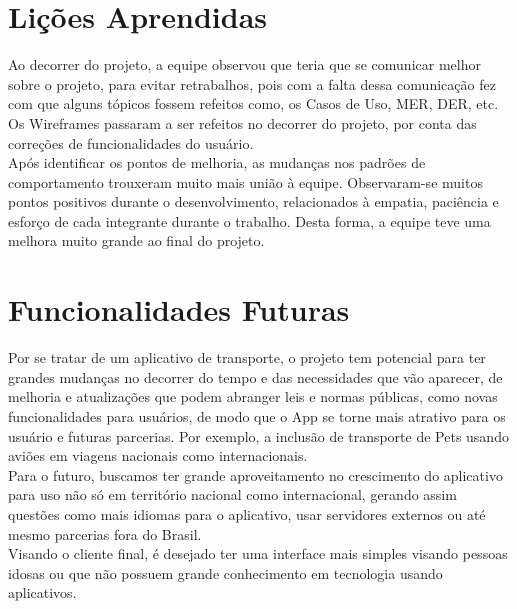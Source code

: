 \section{Lições Aprendidas}
Ao decorrer do projeto, a equipe observou que teria que se comunicar melhor sobre o projeto, para evitar retrabalhos, pois com a falta dessa comunicação fez com que alguns tópicos fossem refeitos como, os Casos de Uso, MER, DER, etc.\\
Os Wireframes passaram a ser refeitos no decorrer do projeto, por conta das correções de funcionalidades do usuário. \\
Após identificar os pontos de melhoria, as mudanças nos padrões de comportamento trouxeram muito mais união à equipe. Observaram-se muitos pontos positivos durante o desenvolvimento, relacionados à empatia, paciência  e esforço de cada integrante durante o trabalho. Desta forma, a equipe teve uma melhora muito grande ao final do projeto. \\


\section{Funcionalidades Futuras}
Por se tratar de um aplicativo de transporte, o projeto tem potencial para ter grandes mudanças no decorrer do tempo e das necessidades que vão aparecer, de melhoria e atualizações que podem abranger leis e normas públicas, como novas funcionalidades para usuários, de modo que o App se torne mais atrativo para os usuário e futuras parcerias. Por exemplo, a inclusão de transporte de Pets usando aviões em viagens nacionais como internacionais.\\
Para o futuro, buscamos ter grande aproveitamento no crescimento do aplicativo para uso não só em território nacional como internacional, gerando assim questões como mais idiomas para o aplicativo, usar servidores externos ou até mesmo parcerias fora do Brasil.\\
Visando o cliente final, é desejado ter uma interface mais simples visando pessoas idosas ou que não possuem grande conhecimento em tecnologia usando aplicativos.\\

